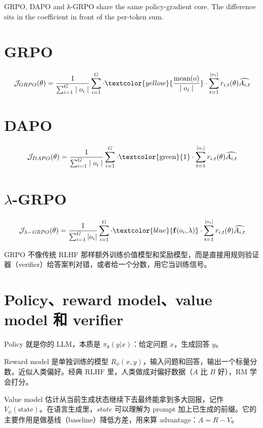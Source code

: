 GRPO, DAPO and λ-GRPO share the same policy-gradient core. The difference sits in the coefficient in front of the per-token sum.

\section{GRPO}

\[
\mathcal{J}_{GRPO}(\theta) = \frac{1}{\sum_{i=1}^{G} \mid o_i \mid} \sum_{i=1}^{G} \cdot \textcolor{yellow}{\frac{\text{mean}(o)}{\mid o_i \mid}} \cdot \sum_{t=1}^{|o_i|} r_{i,t}(\theta) \widehat{A_{i,t}}
\]

\section{DAPO}

\[
\mathcal{J}_{DAPO}(\theta) = \frac{1}{\sum_{i=1}^{G} \mid o_i \mid} \sum_{i=1}^{G} \cdot \text{\textcolor{green}{1}} \cdot \sum_{t=1}^{|o_i|} r_{i,t}(\theta) \widehat{A_{i,t}}
\]

\section{\(\lambda\)-GRPO}

\[
\mathcal{J}_{\lambda-\mathit{GRP}O}(\theta) = \frac{1}{\sum_{i=1}^{G} |o_i|} \sum_{i=1}^{G} \cdot \textcolor{blue}{\mathbf{f}(o_i, \lambda)} \cdot \sum_{t=1}^{|o_i|} r_{i,t}(\theta) \widehat{A_{i,t}}
\]

GRPO 不像传统 RLHF 那样额外训练价值模型和奖励模型，而是直接用规则验证器（verifier）给答案判对错，或者给一个分数，用它当训练信号。

\section{Policy、reward model、value model 和 verifier}

Policy 就是你的 LLM，本质是 \(\pi_\theta(y|x)\)：给定问题 \(x\)，生成回答 \(y\)。

Reward model 是单独训练的模型 \(R_\phi(x,y)\)，输入问题和回答，输出一个标量分数，近似人类偏好。经典 RLHF 里，人类做成对偏好数据（\(A\) 比 \(B\) 好），RM 学会打分。

Value model 估计从当前生成状态继续下去最终能拿到多大回报，记作 \(V_\psi(\text{state})\)。在语言生成里，\(state\) 可以理解为 prompt 加上已生成的前缀。它的主要作用是做基线（baseline）降低方差，用来算 advantage：\(A = R - V\)。

